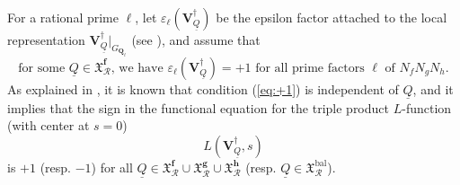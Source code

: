 \documentclass[10pt,letterpaper]{amsart}
\theoremstyle{plain}
\theoremstyle{definition}
\theoremstyle{definition}
\theoremstyle{plain}
\theoremstyle{plain}
\theoremstyle{plain}
\theoremstyle{remark}
\numberwithin{equation}{section}
\DeclareMathOperator{\bal}{\mathrm{bal}}
\newcommand{\VQdag}{{\mathbf{V}_{\underline{Q}}^\dagger}}
\newcommand{\Q}{\mathbf{Q}}
\newcommand{\bff}{{\boldsymbol{f}}}
\newcommand{\bfg}{{\boldsymbol{g}}}
\newcommand{\bfh}{{\boldsymbol{h}}}
\begin{document}
For a rational prime $\ell$, let $\varepsilon_\ell(\VQdag)$ be the epsilon factor attached to the local representation $\VQdag\vert_{G_{\Q_\ell}}$ %
(see \cite[p.\,21]{tate-background}), and assume that 
\begin{equation}\label{eq:+1}
\textrm{for some $\underline{Q}\in\mathfrak{X}_{\mathcal{R}}^\bff$, we have $\varepsilon_\ell(\VQdag)=+1$ for all prime factors $\ell$ of $N_f N_g N_h$.}\tag{sgn}
\end{equation}
As explained in \cite[\S{1.2}]{hsieh-triple}, it is known that condition (\ref{eq:+1}) is independent of $\underline{Q}$, and it implies that the sign in the functional equation for the triple product $L$-function (with center at $s=0$) 
\[
L(\VQdag,s)
\] 
is $+1$ (resp. $-1$) for all $\underline{Q}\in\mathfrak{X}_{\mathcal{R}}^\bff\cup\mathfrak{X}_{\mathcal{R}}^\bfg\cup\mathfrak{X}_{\mathcal{R}}^\bfh$ (resp. $\underline{Q}\in\mathfrak{X}_{\mathcal{R}}^{\bal}$). 



\end{document}

